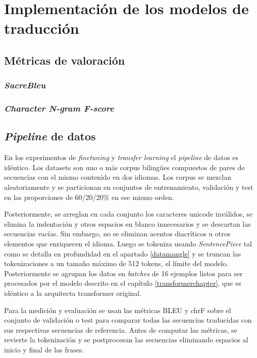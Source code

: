 \chapter{Implementación de los modelos de traducción}

\section{Métricas de valoración}
\subsection{\textit{SacreBleu}}
\cite{Post2018Oct}
\subsection{\textit{Character N-gram F-score}}
\cite{popovic-2015-chrf}

\section{\textit{Pipeline} de datos}\label{datapipeline}
En los experimentos de \textit{finetuning} y \textit{transfer learning} el \textit{pipeline} de datos es idéntico. Los datasets son uno o más corpus biling{\"u}es compuestos de pares de secuencias con el mismo contenido en dos idiomas. Los corpus se mezclan aleatoriamente y se particionan en conjuntos de entrenamiento, validación y test en las proporciones de 60/20/20\% en ese mismo orden.

Posteriormente, se arreglan en cada conjunto los caracteres unicode inválidos, se elimina la indentación y otros espacios en blanco innecesarios y se descartan las secuencias vacías. Sin embargo, no se eliminan acentos diacríticos u otros elementos que enriquecen el idioma. Luego se tokeniza usando \textit{SentencePiece} tal como se detalla en profundidad en el apartado \ref{datamangle} y se truncan las tokenizaciones a un tamaño máximo de 512 tokens, el límite del modelo. Posteriormente se agrupan los datos en \textit{batches} de 16 ejemplos listos para ser procesados por el modelo descrito en el capítulo \ref{transformerchapter}, que es idéntico a la arquitecta transformer original.

Para la medición y evaluación se usan las métricas BLEU y chrF sobre el conjunto de validación o test para comparar todas las secuencias traducidas con sus respectivas secuencias de referencia. Antes de computar las métricas, se revierte la tokenización y se postprocesan las secuencias eliminando espacios al inicio y final de las frases.

